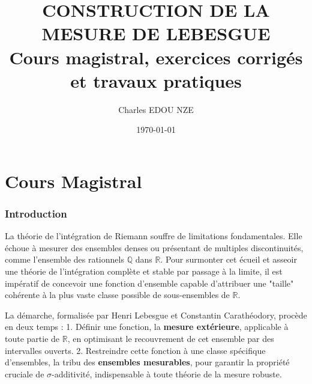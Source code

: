 \documentclass[11pt,a4paper]{article}
\title{\Huge CONSTRUCTION DE LA MESURE DE LEBESGUE \\ \large Cours magistral, exercices corrigés et travaux pratiques}
\author{\Large Charles EDOU NZE}
\date{\today}
\begin{document}
\maketitle
\tableofcontents
\newpage

\part{Cours Magistral}

\section{Introduction}

La théorie de l'intégration de Riemann souffre de limitations fondamentales. Elle échoue à mesurer des ensembles denses ou présentant de multiples discontinuités, comme l'ensemble des rationnels $\mathbb{Q}$ dans $\mathbb{R}$. Pour surmonter cet écueil et asseoir une théorie de l'intégration complète et stable par passage à la limite, il est impératif de concevoir une fonction d'ensemble capable d'attribuer une "taille" cohérente à la plus vaste classe possible de sous-ensembles de $\mathbb{R}$.

La démarche, formalisée par Henri Lebesgue et Constantin Carathéodory, procède en deux temps :
1. Définir une fonction, la \textbf{mesure extérieure}, applicable à toute partie de $\mathbb{R}$, en optimisant le recouvrement de cet ensemble par des intervalles ouverts.
2. Restreindre cette fonction à une classe spécifique d'ensembles, la tribu des \textbf{ensembles mesurables}, pour garantir la propriété cruciale de $\sigma$-additivité, indispensable à toute théorie de la mesure robuste.

\end{document}
